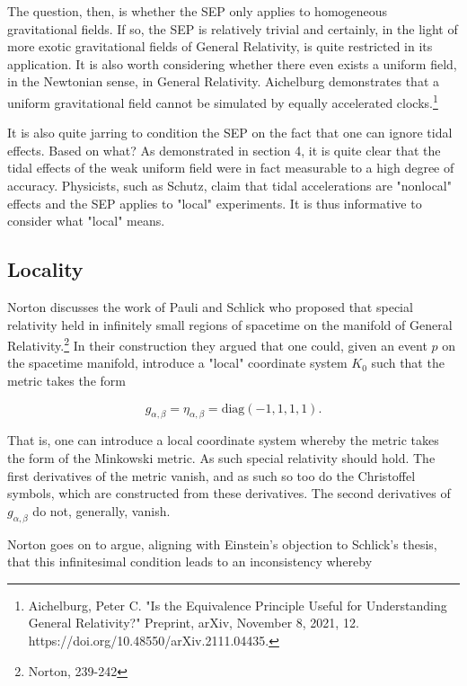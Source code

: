 \documentclass[11pt]{article}
\begin{document}
The question, then, is whether the SEP only applies to homogeneous gravitational fields. If so, the SEP is relatively trivial and certainly, in the light of more exotic gravitational fields of General Relativity, is quite restricted in its application. It is also worth considering whether there even exists a uniform field, in the Newtonian sense, in General Relativity. Aichelburg demonstrates that a uniform gravitational field cannot be simulated by equally accelerated clocks.\footnote{Aichelburg, Peter C. "Is the Equivalence Principle Useful for Understanding General Relativity?" Preprint, arXiv, November 8, 2021, 12. https://doi.org/10.48550/arXiv.2111.04435.}

It is also quite jarring to condition the SEP on the fact that one can ignore tidal effects. Based on what? As demonstrated in section 4, it is quite clear that the tidal effects of the weak uniform field were in fact measurable to a high degree of accuracy. Physicists, such as Schutz, claim that tidal accelerations are "nonlocal" effects and the SEP applies to "local" experiments. It is thus informative to consider what "local" means. 

\subsection{Locality}

Norton discusses the work of Pauli and Schlick who proposed that special relativity held in infinitely small regions of spacetime on the manifold of General Relativity.\footnote{Norton, 239-242} In their construction they argued that one could, given an event $p$ on the spacetime manifold, introduce a "local" coordinate system $K_0$ such that the metric takes the form

\begin{equation}
    g_{\alpha, \beta} = \eta_{\alpha, \beta} = \mathrm{diag}(-1,1,1,1).
\end{equation}

That is, one can introduce a local coordinate system whereby the metric takes the form of the Minkowski metric. As such special relativity should hold. The first derivatives of the metric vanish, and as such so too do the Christoffel symbols, which are constructed from these derivatives. The second derivatives of $g_{\alpha, \beta}$ do not, generally, vanish. 

Norton goes on to argue, aligning with Einstein's objection to Schlick's thesis, that this infinitesimal condition leads to an inconsistency whereby
\end{document}
